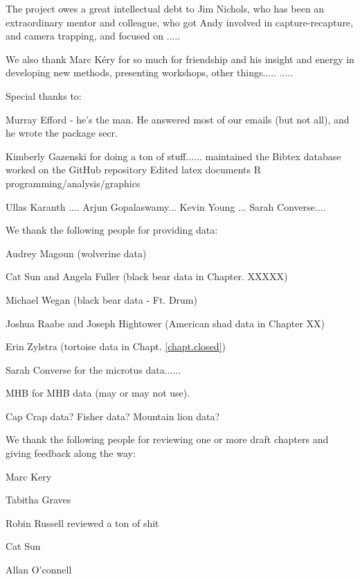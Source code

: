 The project owes a great intellectual debt to Jim Nichols, who has
been an extraordinary mentor and colleague, who  
got Andy involved in capture-recapture, and camera trapping, and
focused on .....

We also thank Marc K\'{e}ry for so much for friendship and his insight
and energy in developing new methods, presenting workshops, other things.....
..... 



Special thanks to:

Murray Efford - he's the man. He answered most of our emails (but not
all), and he wrote the package secr.

Kimberly Gazenski for doing a ton of stuff......
maintained the Bibtex database
worked on the GitHub repository
Edited latex documents
R programming/analysis/graphics

Ullas Karanth ....
Arjun Gopalaswamy...
Kevin Young ...
Sarah Converse....



We thank the following people for providing data:

Audrey Magoun (wolverine data)

Cat Sun and Angela Fuller (black bear data in Chapter. XXXXX)

Michael Wegan (black bear data - Ft. Drum)

Joshua Raabe and Joseph Hightower (American shad data in Chapter XX)

Erin Zylstra (tortoise data in Chapt. \ref{chapt.closed})

Sarah Converse for the microtus data......

MHB for MHB data (may or may not use).

Cap Crap data? Fisher data?  Mountain lion data?


We thank the following people for reviewing one or more draft chapters
and giving feedback along the way:

Marc Kery

Tabitha Graves

Robin Russell reviewed a ton of shit

Cat Sun

Allan O'connell

